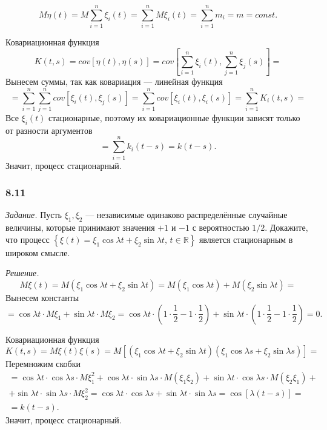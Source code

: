 $$M \eta \left( t \right) =
  M \sum \limits_{i = 1}^n \xi_i \left( t \right) =
  \sum \limits_{i = 1}^n M \xi_i \left( t \right) =
  \sum \limits_{i = 1}^n m_i =
  m =
  const.$$

Ковариационная функция
$$K \left( t, s \right) =
  cov \left[ \eta \left( t \right), \eta \left( s \right) \right] =
  cov \left[
    \sum \limits_{i = 1}^n \xi_i \left( t \right), \sum \limits_{j = 1}^n \xi_j \left( s \right)
  \right] =$$
Вынесем суммы, так как ковариация --- линейная функция
$$= \sum \limits_{i = 1}^n
    \sum \limits_{j = 1}^n cov \left[ \xi_i \left( t \right), \xi_j \left( s \right) \right] =
  \sum \limits_{i = 1}^n cov \left[ \xi_i \left( t \right), \xi_i \left( s \right) \right] =
  \sum \limits_{i = 1}^n K_i \left( t, s \right) =$$
Все $ \xi_i \left( t \right) $ стационарные,
поэтому их ковариационные функции зависят только от разности аргументов
$$= \sum \limits_{i = 1}^n k_i \left( t - s \right) =
  k \left( t - s \right).$$
Значит, процесс стационарный.

\subsubsection*{8.11}

\textit{Задание.}
Пусть $ \xi_1, \xi_2$ --- независимые одинаково распределённые случайные величины,
которые принимают значения $+1$ и $-1$ с вероятностью $1 / 2$.
Докажите, что процесс
$ \left\{
  \xi \left( t \right) = \xi_1 \cos \lambda t + \xi_2 \sin \lambda t, \, t \in \mathbb{R} \right\} $
является стационарным в широком смысле.

\textit{Решение.}
$$M \xi \left( t \right) =
  M \left( \xi_1 \cos \lambda t + \xi_2 \sin \lambda t \right) =
  M \left( \xi_1 \cos \lambda t \right) + M \left( \xi_2 \sin \lambda t \right) =$$
Вынесем константы
$$= \cos \lambda t \cdot M \xi_1 + \sin \lambda t \cdot M \xi_2 =
  \cos \lambda t \cdot \left( 1 \cdot \frac{1}{2} - 1 \cdot \frac{1}{2} \right) +
  \sin \lambda t \cdot \left( 1 \cdot \frac{1}{2} - 1 \cdot \frac{1}{2} \right) =
  0.$$

Ковариационная функция
$$K \left( t, s \right) =
  M \xi \left( t \right) \xi \left( s \right) =
  M \left[
    \left( \xi_1 \cos \lambda t + \xi_2 \sin \lambda t \right)
    \left( \xi_1 \cos \lambda s + \xi_2 \sin \lambda s \right) \right] =$$
Перемножим скобки
\begin{gather*}
  = \cos \lambda t \cdot \cos \lambda s \cdot M \xi_1^2 +
  \cos \lambda t \cdot \sin \lambda s \cdot M \left( \xi_1 \xi_2 \right) +
  \sin \lambda t \cdot \cos \lambda s \cdot M \left( \xi_2 \xi_1 \right) + \\
  + \sin \lambda t \cdot \sin \lambda s \cdot M \xi_2^2 =
  \cos \lambda t \cdot \cos \lambda s + \sin \lambda t \cdot \sin \lambda s =
  \cos \left[ \lambda \left( t - s \right) \right] = \\
  = k \left( t - s \right).
\end{gather*}
Значит, процесс стационарный.

